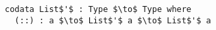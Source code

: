 \begin{lstlisting}[mathescape,title=\idrisBlock]
codata List$'$ : Type $\to$ Type where
  (::) : a $\to$ List$'$ a $\to$ List$'$ a
\end{lstlisting}






  


